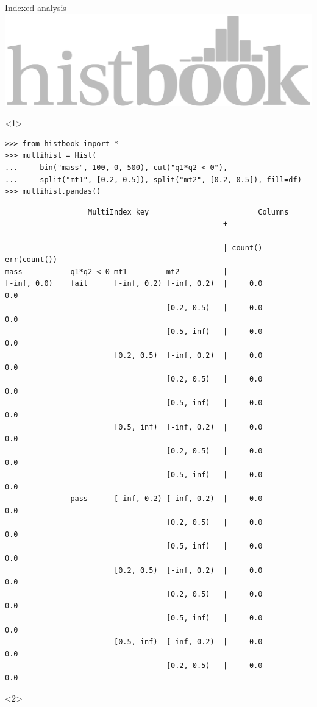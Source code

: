 \documentclass[aspectratio=169]{beamer}
\begin{document}
\begin{frame}[fragile]{Indexed analysis}
\large
\vspace{0.25 cm}
\hfill \includegraphics[height=1 cm]{histbook-logo.pdf}

\vspace{-1 cm}
\scriptsize
\begin{onlyenv}<1>
\scriptsize
\begin{verbatim}
>>> from histbook import *
>>> multihist = Hist(
...     bin("mass", 100, 0, 500), cut("q1*q2 < 0"),
...     split("mt1", [0.2, 0.5]), split("mt2", [0.2, 0.5]), fill=df)
>>> multihist.pandas()
\end{verbatim}
\scriptsize
\vspace{-0.25 cm}
\begin{verbatim}
                   MultiIndex key                         Columns
--------------------------------------------------+---------------------
                                                  | count() err(count())
mass           q1*q2 < 0 mt1         mt2          |
[-inf, 0.0)    fail      [-inf, 0.2) [-inf, 0.2)  |     0.0          0.0
                                     [0.2, 0.5)   |     0.0          0.0
                                     [0.5, inf)   |     0.0          0.0
                         [0.2, 0.5)  [-inf, 0.2)  |     0.0          0.0
                                     [0.2, 0.5)   |     0.0          0.0
                                     [0.5, inf)   |     0.0          0.0
                         [0.5, inf)  [-inf, 0.2)  |     0.0          0.0
                                     [0.2, 0.5)   |     0.0          0.0
                                     [0.5, inf)   |     0.0          0.0
               pass      [-inf, 0.2) [-inf, 0.2)  |     0.0          0.0
                                     [0.2, 0.5)   |     0.0          0.0
                                     [0.5, inf)   |     0.0          0.0
                         [0.2, 0.5)  [-inf, 0.2)  |     0.0          0.0
                                     [0.2, 0.5)   |     0.0          0.0
                                     [0.5, inf)   |     0.0          0.0
                         [0.5, inf)  [-inf, 0.2)  |     0.0          0.0
                                     [0.2, 0.5)   |     0.0          0.0
\end{verbatim}
\end{onlyenv}
\begin{onlyenv}<2>

\end{onlyenv}
\end{frame}
\end{document}
